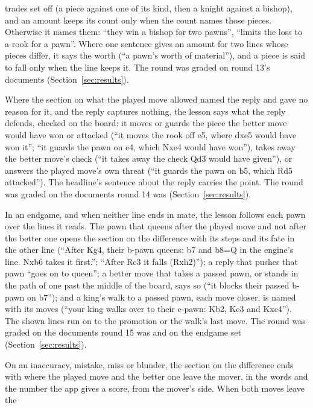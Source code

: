 \documentclass[11pt]{article}
\begin{document}
\begin{description}[style=nextline, nosep]
trades set off (a piece against one of its kind, then a knight against a bishop), and an amount
keeps its count only when the count names those pieces. Otherwise it names them: ``they win a
bishop for two pawns'', ``limits the loss to a rook for a pawn''. Where one sentence gives an
amount for two lines whose pieces differ, it says the worth (``a pawn's worth of material''), and
a piece is said to fall only when the line keeps it. The round was graded on round 13's documents
(Section~\ref{sec:results}).
\item[Round 15: what a quiet reply defends.] Where the section on what the played move allowed
named the reply and gave no reason for it, and the reply captures nothing, the lesson says what the
reply defends, checked on the board: it moves or guards the piece the better move would have won or
attacked (``it moves the rook off e5, where dxe5 would have won it''; ``it guards the pawn on e4,
which Nxe4 would have won''), takes away the better move's check (``it takes away the check Qd3
would have given''), or answers the played move's own threat (``it guards the pawn on b5, which Rd5
attacked''). The headline's sentence about the reply carries the point. The round was graded on
the documents round 14 was (Section~\ref{sec:results}).
\item[Round 16: an endgame's passed pawns.] In an endgame, and when neither line ends in mate, the
lesson follows each pawn over the lines it reads. The pawn that queens after the played move and
not after the better one opens the section on the difference with its steps and its fate in the
other line (``After Kg4, their b-pawn queens: b7 and b8=Q in the engine's line. Nxb6 takes it
first.''; ``After Rc3 it falls (Rxh2)''); a reply that pushes that pawn ``goes on to queen''; a
better move that takes a passed pawn, or stands in the path of one past the middle of the board,
says so (``it blocks their passed b-pawn on b7''); and a king's walk to a passed pawn, each move
closer, is named with its moves (``your king walks over to their c-pawn: Kb2, Kc3 and Kxc4''). The
shown lines run on to the promotion or the walk's last move. The round was graded on the documents
round 15 was and on the endgame set (Section~\ref{sec:results}).
\item[Round 17: where each move leaves the game.] On an inaccuracy, mistake, miss or blunder, the
section on the difference ends with where the played move and the better one leave the mover, in
the words and the number the app gives a score, from the mover's side. When both moves leave the

\end{description}
\end{document}
